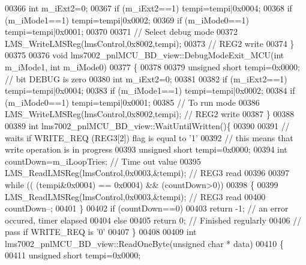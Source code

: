 \begin{DoxyCode}
{{{{{{{00366         \textcolor{keywordtype}{int} m\_iExt2=0;
00367         \textcolor{keywordflow}{if} (m\_iExt2==1)  tempi=tempi|0x0004;
00368         \textcolor{keywordflow}{if} (m\_iMode1==1) tempi=tempi|0x0002;
00369         \textcolor{keywordflow}{if} (m\_iMode0==1) tempi=tempi|0x0001;
00370 
00371         \textcolor{comment}{// Select debug mode}
00372         LMS_WriteLMSReg(lmsControl,0x8002,tempi);
00373         \textcolor{comment}{// REG2 write}
00374 \}
00375 
00376  \textcolor{keywordtype}{void} lms7002_pnlMCU_BD_view::DebugModeExit_MCU(\textcolor{keywordtype}{int} m_iMode1, \textcolor{keywordtype}{int} m_iMode0)
00377 \{
00378 
00379         \textcolor{keywordtype}{unsigned} \textcolor{keywordtype}{short} tempi=0x0000; \textcolor{comment}{// bit DEBUG is zero}
00380         \textcolor{keywordtype}{int} m\_iExt2=0;
00381 
00382         \textcolor{keywordflow}{if} (m\_iExt2==1)  tempi=tempi|0x0004;
00383         \textcolor{keywordflow}{if} (m\_iMode1==1) tempi=tempi|0x0002;
00384         \textcolor{keywordflow}{if} (m\_iMode0==1) tempi=tempi|0x0001;
00385         \textcolor{comment}{// To run mode}
00386         LMS_WriteLMSReg(lmsControl,0x8002,tempi);  \textcolor{comment}{// REG2 write}
00387 \}
00388 
00389  \textcolor{keywordtype}{int} lms7002_pnlMCU_BD_view::WaitUntilWritten()\{
00390 
00391      \textcolor{comment}{// waits if WRITE\_REQ (REG3[2]) flag is equal to '1'}
00392      \textcolor{comment}{// this means that  write operation is in progress}
00393     \textcolor{keywordtype}{unsigned} \textcolor{keywordtype}{short} tempi=0x0000;
00394     \textcolor{keywordtype}{int} countDown=m_iLoopTries;  \textcolor{comment}{// Time out value}
00395     LMS_ReadLMSReg(lmsControl,0x0003,&tempi); \textcolor{comment}{// REG3 read}
00396 
00397     \textcolor{keywordflow}{while} (( (tempi&0x0004) == 0x0004) && (countDown>0))
00398     \{
00399         LMS_ReadLMSReg(lmsControl,0x0003,&tempi); \textcolor{comment}{// REG3 read}
00400         countDown--;
00401     \}
00402     \textcolor{keywordflow}{if} (countDown==0)
00403         \textcolor{keywordflow}{return} -1; \textcolor{comment}{// an error occured, timer elapsed}
00404     \textcolor{keywordflow}{else}
00405         \textcolor{keywordflow}{return} 0; \textcolor{comment}{// Finished regularly}
00406     \textcolor{comment}{// pass if WRITE\_REQ is '0'}
00407 \}
00408 
00409  \textcolor{keywordtype}{int} lms7002_pnlMCU_BD_view::ReadOneByte(\textcolor{keywordtype}{unsigned} \textcolor{keywordtype}{char} * data)
00410 \{
00411     \textcolor{keywordtype}{unsigned} \textcolor{keywordtype}{short} tempi=0x0000;
}}}}}}}
\end{DoxyCode}
